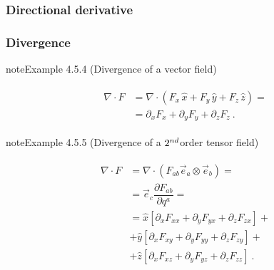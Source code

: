 \documentclass[letterpaper,10pt,english]{jupyterBook}
\begin{document}
\subsubsection{Directional derivative}
\label{\detokenize{ch/tensor-algebra-calculus/calculus-euclidean-cartesian:directional-derivative}}

\subsubsection{Divergence}
\label{\detokenize{ch/tensor-algebra-calculus/calculus-euclidean-cartesian:divergence}}\label{\detokenize{ch/tensor-algebra-calculus/calculus-euclidean-cartesian:tensor-calculus-cartesian-differential-operators-divergence}}\label{ch/tensor-algebra-calculus/calculus-euclidean-cartesian:example-3}
\begin{sphinxadmonition}{note}{Example 4.5.4 (Divergence of a vector field)}


\begin{equation*}
\begin{split}\begin{aligned}
 \nabla \cdot F 
  & = \nabla \cdot \left( F_x \, \hat{x} + F_y \, \hat{y} + F_z \, \hat{z} \right) = \\
  & = \partial_x F_x + \partial_y F_y + \partial_z F_z \ .
\end{aligned}\end{split}
\end{equation*}\end{sphinxadmonition}
\label{ch/tensor-algebra-calculus/calculus-euclidean-cartesian:example-4}
\begin{sphinxadmonition}{note}{Example 4.5.5 (Divergence of a \protect\(2^{nd}\protect\)\sphinxhyphen{}order tensor field)}


\begin{equation*}
\begin{split}\begin{aligned}
 \nabla \cdot F 
  & = \nabla \cdot \left( F_{ab} \vec{e}_a \otimes \vec{e}_b \right) = \\
  & = \vec{e}_c \dfrac{\partial F_{ab}}{\partial q^a} = \\
  & = \hat{x} \left[ \partial_x F_{xx} + \partial_y F_{yx} + \partial_z F_{zx} \right] + \\ 
  & + \hat{y} \left[ \partial_x F_{xy} + \partial_y F_{yy} + \partial_z F_{zy} \right] + \\ 
  & + \hat{z} \left[ \partial_x F_{xz} + \partial_y F_{yz} + \partial_z F_{zz} \right] \ .
\end{aligned}\end{split}
\end{equation*}\end{sphinxadmonition}
\end{document}

